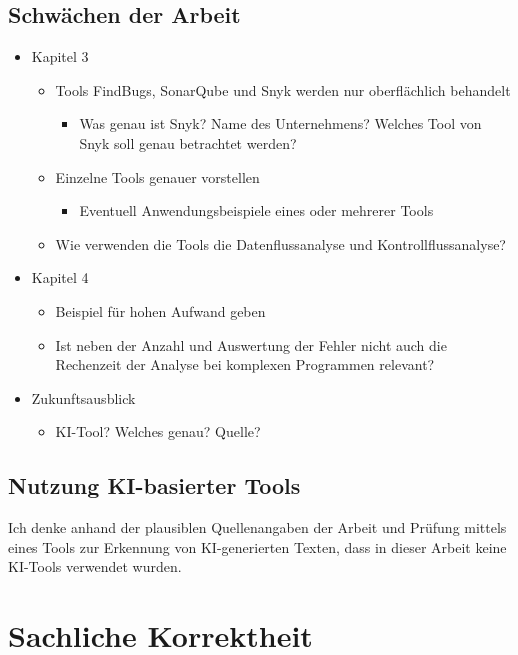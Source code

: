 \documentclass[a4paper,DIV=16]{scrartcl}
\begin{document}
\subsection*{Schwächen der Arbeit}
\begin{itemize}
  \item Kapitel 3
  \begin{itemize}
      \item Tools FindBugs, SonarQube und Snyk werden nur oberflächlich
      behandelt
      \begin{itemize}
          \item Was genau ist Snyk? Name des Unternehmens? Welches Tool von Snyk
          soll genau betrachtet werden?
      \end{itemize}
      \item Einzelne Tools genauer vorstellen
      \begin{itemize}
          \item Eventuell Anwendungsbeispiele eines oder mehrerer Tools
      \end{itemize}
      \item Wie verwenden die Tools die Datenflussanalyse und
      Kontrollflussanalyse?
  \end{itemize}
  \item Kapitel 4
  \begin{itemize}
      \item Beispiel für hohen Aufwand geben
      \item Ist neben der Anzahl und Auswertung der Fehler nicht auch die
      Rechenzeit der Analyse bei komplexen Programmen relevant?
  \end{itemize}
  \item Zukunftsausblick
  \begin{itemize}
      \item KI-Tool? Welches genau? Quelle?
  \end{itemize}
\end{itemize}



\subsection*{Nutzung KI-basierter Tools}

  Ich denke anhand der plausiblen Quellenangaben der Arbeit und Prüfung mittels
  eines Tools zur Erkennung von KI-generierten Texten, dass in dieser Arbeit
  keine KI-Tools verwendet wurden.  

\section*{Sachliche Korrektheit}
\end{document}
